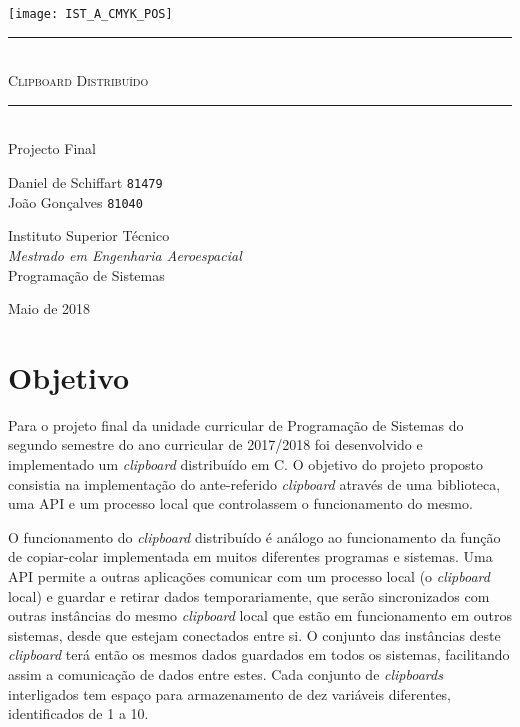 \documentclass{article}
\begin{document}
\thispagestyle{empty}
	\texttt{[image: IST\_A\_CMYK\_POS]}
	
	\begin{center}
		\vspace{70mm} %
		\rule{\linewidth}{0.5pt} \\
		\Huge \textsc{Clipboard Distribuído} \\
		\rule{\linewidth}{2pt} \\
		\vspace{10mm} %
		\LARGE Projecto Final
		
		\vspace{\fill} %
		\large
		Daniel de Schiffart \texttt{81479} \\
		João Gonçalves \texttt{81040}
		
		\vspace{10mm} %
		\Large Instituto Superior Técnico \\
		\textit{Mestrado em Engenharia Aeroespacial} \\
		\vspace{1mm}
		\large Programação de Sistemas
		
		\vspace{10mm} %
		\Large Maio de 2018
	\end{center}
\newpage

\section{Objetivo}

Para o projeto final da unidade curricular de Programação de Sistemas do
segundo semestre do ano curricular de 2017/2018 foi desenvolvido e
implementado um \textit{clipboard} distribuído em C. O objetivo do
projeto proposto consistia na implementação do ante-referido 
\textit{clipboard} através de uma biblioteca, uma API e um processo
local que controlassem o funcionamento do mesmo.

O funcionamento do \textit{clipboard} distribuído é análogo ao
funcionamento da função de copiar-colar implementada em muitos diferentes
programas e sistemas. Uma API permite a outras aplicações comunicar com
um processo local (o \textit{clipboard} local) e guardar e retirar dados
temporariamente, que serão sincronizados com outras instâncias do mesmo
\textit{clipboard} local que estão em funcionamento em outros sistemas,
desde que estejam conectados entre si. O conjunto das instâncias deste
\textit{clipboard} terá então os mesmos dados guardados em todos os
sistemas, facilitando assim a comunicação de dados entre estes.
Cada conjunto de \textit{clipboards} interligados tem espaço para
armazenamento de dez variáveis diferentes, identificados de 1 a 10.
\end{document}
